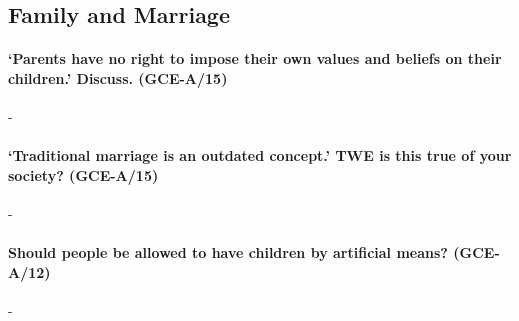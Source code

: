 \documentclass[../../main]{subfiles}
\begin{document}
\subsection{Family and Marriage}

\paragraph{`Parents have no right to impose their own values and beliefs on their children.' Discuss. (GCE-A/15)}-

\paragraph{`Traditional marriage is an outdated concept.' TWE is this true of your society? (GCE-A/15)}-

\paragraph{Should people be allowed to have children by artificial means? (GCE-A/12)}-
\end{document}
